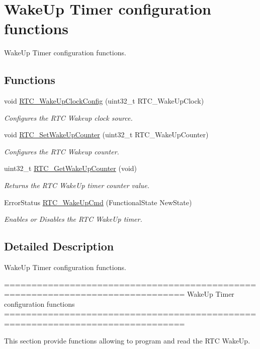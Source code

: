 \hypertarget{group___r_t_c___group4}{\section{Wake\-Up Timer configuration functions}
\label{group___r_t_c___group4}
}


Wake\-Up Timer configuration functions.  


\subsection*{Functions}
\begin{DoxyCompactItemize}
\item 
void \hyperlink{group___r_t_c___group4_ga2557b02b318211112731a91a190c4b26}{R\-T\-C\-\_\-\-Wake\-Up\-Clock\-Config} (uint32\-\_\-t R\-T\-C\-\_\-\-Wake\-Up\-Clock)
\begin{DoxyCompactList}\small\item\em Configures the R\-T\-C Wakeup clock source. \end{DoxyCompactList}\item 
void \hyperlink{group___r_t_c___group4_ga1412044eb756a166c1cf341f3d46ed6b}{R\-T\-C\-\_\-\-Set\-Wake\-Up\-Counter} (uint32\-\_\-t R\-T\-C\-\_\-\-Wake\-Up\-Counter)
\begin{DoxyCompactList}\small\item\em Configures the R\-T\-C Wakeup counter. \end{DoxyCompactList}\item 
uint32\-\_\-t \hyperlink{group___r_t_c___group4_gae63aab672e917cc48e298162c3dec049}{R\-T\-C\-\_\-\-Get\-Wake\-Up\-Counter} (void)
\begin{DoxyCompactList}\small\item\em Returns the R\-T\-C Wake\-Up timer counter value. \end{DoxyCompactList}\item 
Error\-Status \hyperlink{group___r_t_c___group4_ga2ce05293303e0d7879c6d755c5355b4c}{R\-T\-C\-\_\-\-Wake\-Up\-Cmd} (Functional\-State New\-State)
\begin{DoxyCompactList}\small\item\em Enables or Disables the R\-T\-C Wake\-Up timer. \end{DoxyCompactList}\end{DoxyCompactItemize}


\subsection{Detailed Description}
Wake\-Up Timer configuration functions. \begin{DoxyVerb} ===============================================================================
                     WakeUp Timer configuration functions
 ===============================================================================  

  This section provide functions allowing to program and read the RTC WakeUp.\end{DoxyVerb}
 


